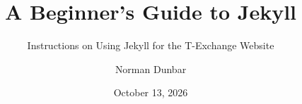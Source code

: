 \documentclass[graybox,envcountchap,sectrefs]{svmonoND}
\begin{document}
\author{Norman Dunbar}
\title{A Beginner's Guide to Jekyll}
\date{October 13, 2026}
\subtitle{Instructions on Using Jekyll for the T-Exchange Website}
\maketitle

\frontmatter%

\tableofcontents



\mainmatter%









\appendixpage
\appendix




\backmatter%
%
%

\end{document}
